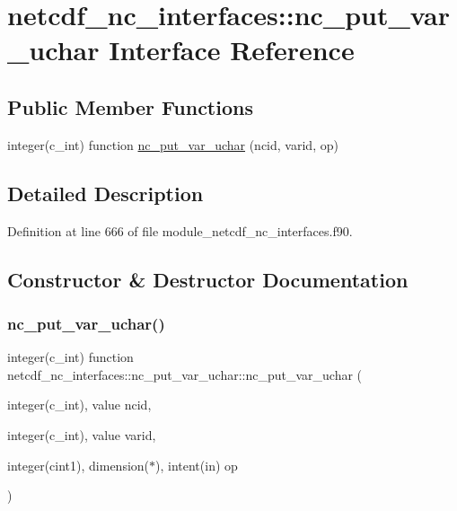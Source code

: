 \hypertarget{interfacenetcdf__nc__interfaces_1_1nc__put__var__uchar}{}\section{netcdf\+\_\+nc\+\_\+interfaces\+:\+:nc\+\_\+put\+\_\+var\+\_\+uchar Interface Reference}
\label{interfacenetcdf__nc__interfaces_1_1nc__put__var__uchar}
\subsection*{Public Member Functions}
\begin{DoxyCompactItemize}
\item 
integer(c\+\_\+int) function \hyperlink{interfacenetcdf__nc__interfaces_1_1nc__put__var__uchar_a412612ed1e7f8e05ee963f70867a0382}{nc\+\_\+put\+\_\+var\+\_\+uchar} (ncid, varid, op)
\end{DoxyCompactItemize}


\subsection{Detailed Description}


Definition at line 666 of file module\+\_\+netcdf\+\_\+nc\+\_\+interfaces.\+f90.



\subsection{Constructor \& Destructor Documentation}
\mbox{\label{interfacenetcdf__nc__interfaces_1_1nc__put__var__uchar_a412612ed1e7f8e05ee963f70867a0382}} 
\subsubsection{\texorpdfstring{nc\+\_\+put\+\_\+var\+\_\+uchar()}{nc\_put\_var\_uchar()}}
{\footnotesize\ttfamily integer(c\+\_\+int) function netcdf\+\_\+nc\+\_\+interfaces\+::nc\+\_\+put\+\_\+var\+\_\+uchar\+::nc\+\_\+put\+\_\+var\+\_\+uchar (\begin{DoxyParamCaption}\item[{integer(c\+\_\+int), value}]{ncid,  }\item[{integer(c\+\_\+int), value}]{varid,  }\item[{integer(cint1), dimension($\ast$), intent(in)}]{op }\end{DoxyParamCaption})}



